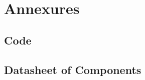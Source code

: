 \chapter{Annexures}
        \section{Code}
        \section{Datasheet of Components}
	        
        	
        	
        	
    